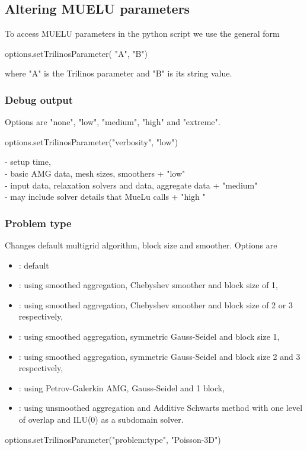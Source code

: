 \subsection{Altering MUELU parameters}
To access MUELU parameters in the python script we use the general form  
\begin{python}
options.setTrilinosParameter( "A", "B")        
\end{python}
where "A" is the Trilinos parameter and "B" is its string value.

\subsubsection{Debug output}
Options are "none", "low", "medium", "high" and "extreme".
\begin{python}
options.setTrilinosParameter("verbosity", "low")  
\end{python}

  - setup time,\\
 - basic AMG data, mesh sizes, smoothers + "low" \\
 - input data, relaxation solvers and data, aggregate data + "medium"\\
 - may include solver details that MueLu calls + "high "\\

\subsubsection{Problem type}
Changes default multigrid algorithm, block size and smoother.  
Options are 
\begin{itemize}
    \item {}: default
    \item {} : using smoothed aggregation, Chebyshev smoother and block size of 1,
    \item {}: using smoothed aggregation, Chebyshev smoother and block size of 2 or 3 respectively,
    \item {}: using smoothed aggregation, symmetric Gauss-Seidel and block size 1,
    \item {}: using smoothed aggregation, symmetric Gauss-Seidel and block size 2 and 3 respectively,
    \item {}: using Petrov-Galerkin AMG, Gauss-Seidel and 1 block,
    \item {}: using unsmoothed aggregation and Additive Schwarts method with one level of overlap and ILU(0) as a subdomain solver.
\end{itemize}
\begin{python}
options.setTrilinosParameter("problem:type", "Poisson-3D")    
\end{python}

